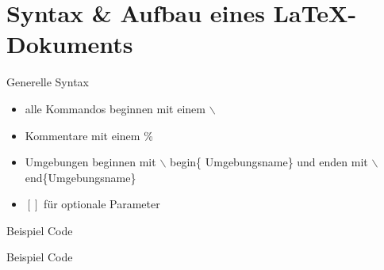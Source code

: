 \section{Syntax \& Aufbau eines \LaTeX -Dokuments}
%
\begin{frame}{Generelle Syntax}
	\begin{itemize}[<+->]
		\item alle Kommandos beginnen mit einem $\backslash$
		\item Kommentare mit einem \%
		\item Umgebungen beginnen mit $\backslash$ begin\{ Umgebungsname\} und enden mit $\backslash$ end\{Umgebungsname\}
		\item $\left[ \right]$ für optionale Parameter
	\end{itemize}
\end{frame}

\begin{frame}[fragile]{Beispiel Code}
	\begin{Code}
	\centering
		\begin{minipage}{0.9\textwidth}
	
		
	
		\end{minipage}
	\end{Code}

\end{frame}
\begin{frame}[fragile]{Beispiel Code}
	\lstsettex
	\begin{Code}
	\centering
		\begin{minipage}{0.9\textwidth}
		
		\end{minipage}
	\end{Code}

\end{frame}

